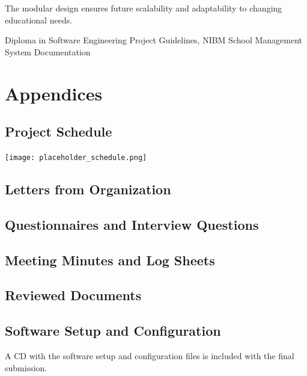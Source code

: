\documentclass[12pt,a4paper]{report}
\begin{document}
The modular design ensures future scalability and adaptability to changing educational needs.

\newpage
\begin{thebibliography}{99}
     Diploma in Software Engineering Project Guidelines, NIBM
     School Management System Documentation
\end{thebibliography}

\appendix
\chapter{Appendices}
\section{Project Schedule}
\texttt{[image: placeholder\_schedule.png]}

\section{Letters from Organization}

\section{Questionnaires and Interview Questions}

\section{Meeting Minutes and Log Sheets}

\section{Reviewed Documents}

\section{Software Setup and Configuration}
A CD with the software setup and configuration files is included with the final submission.

\end{document}
